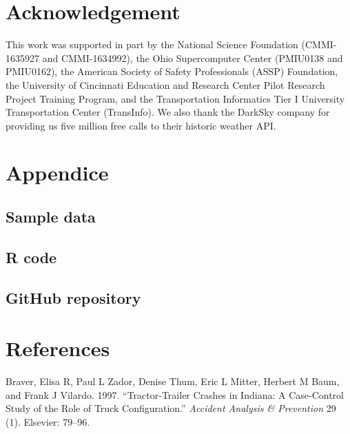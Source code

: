 \documentclass[]{elsarticle} %
\begin{document}
\hypertarget{acknowledgement}{%
\section*{Acknowledgement}\label{acknowledgement}}

This work was supported in part by the National Science Foundation (CMMI-1635927 and CMMI-1634992), the Ohio Supercomputer Center (PMIU0138 and PMIU0162), the American Society of Safety Professionals (ASSP) Foundation, the University of Cincinnati Education and Research Center Pilot Research Project Training Program, and the Transportation Informatics Tier I University Transportation Center (TransInfo). We also thank the DarkSky company for providing us five million free calls to their historic weather API.

\hypertarget{appendice}{%
\section*{Appendice}\label{appendice}}

\hypertarget{sample-data}{%
\subsection{Sample data}\label{sample-data}}

\hypertarget{r-code}{%
\subsection{R code}\label{r-code}}

\hypertarget{github-repository}{%
\subsection{GitHub repository}\label{github-repository}}

\hypertarget{references}{%
\section*{References}\label{references}}

\hypertarget{refs}{}
\leavevmode\hypertarget{ref-braver1997tractor}{}%
Braver, Elisa R, Paul L Zador, Denise Thum, Eric L Mitter, Herbert M Baum, and Frank J Vilardo. 1997. ``Tractor-Trailer Crashes in Indiana: A Case-Control Study of the Role of Truck Configuration.'' \emph{Accident Analysis \& Prevention} 29 (1). Elsevier: 79--96.
\end{document}
